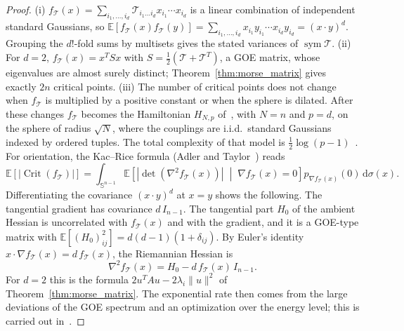 \documentclass[11pt,a4paper,reqno]{amsart}
\theoremstyle{definition}
\numberwithin{equation}{section}
\providecommand{\Sph}{\mathbb{S}}
\newcommand{\dif}{\,\mathrm{d}}
\begin{document}
\begin{proof}
(i) $f_{\mathcal{T}}(x) = \sum_{i_1,\dots,i_d} \mathcal{T}_{i_1\dots i_d} x_{i_1}\cdots x_{i_d}$ is a linear combination of independent standard Gaussians, so $\mathbb{E}[f_{\mathcal{T}}(x) f_{\mathcal{T}}(y)] = \sum_{i_1,\dots,i_d} x_{i_1} y_{i_1} \cdots x_{i_d} y_{i_d} = (x\cdot y)^d$. Grouping the $d!$-fold sums by multisets gives the stated variances of $\operatorname{sym}\mathcal{T}$.
(ii) For $d = 2$, $f_{\mathcal{T}}(x) = x^T S x$ with $S = \frac12(\mathcal{T} + \mathcal{T}^T)$, a GOE matrix, whose eigenvalues are almost surely distinct; Theorem~\ref{thm:morse_matrix} gives exactly $2n$ critical points.
(iii) The number of critical points does not change when $f_{\mathcal{T}}$ is multiplied by a positive constant or when the sphere is dilated. After these changes $f_{\mathcal{T}}$ becomes the Hamiltonian $H_{N,p}$ of~\cite{auffinger2013random}, with $N = n$ and $p = d$, on the sphere of radius $\sqrt{N}$, where the couplings are i.i.d.\ standard Gaussians indexed by ordered tuples. The total complexity of that model is $\frac12\log(p-1)$~\cite{auffinger2013random}. For orientation, the Kac--Rice formula (Adler and Taylor~\cite{adler2007random}) reads
\begin{equation}
    \mathbb{E}[|\operatorname{Crit}(f_{\mathcal{T}})|] = \int_{\Sph^{n-1}} \mathbb{E}\left[ |\det(\nabla^2 f_{\mathcal{T}}(x))| \;\middle|\; \nabla f_{\mathcal{T}}(x) = 0 \right] p_{\nabla f_{\mathcal{T}}(x)}(0) \dif \sigma(x).
\end{equation}
Differentiating the covariance $(x\cdot y)^d$ at $x = y$ shows the following. The tangential gradient has covariance $d\, I_{n-1}$. The tangential part $H_0$ of the ambient Hessian is uncorrelated with $f_{\mathcal{T}}(x)$ and with the gradient, and it is a GOE-type matrix with $\mathbb{E}[(H_0)_{ij}^2] = d(d-1)(1+\delta_{ij})$. By Euler's identity $x \cdot \nabla f_{\mathcal{T}}(x) = d\, f_{\mathcal{T}}(x)$, the Riemannian Hessian is
\begin{equation}
    \nabla^2 f_{\mathcal{T}}(x) = H_0 - d\, f_{\mathcal{T}}(x)\, I_{n-1}.
\end{equation}
For $d = 2$ this is the formula $2u^TAu - 2\lambda_i\|u\|^2$ of Theorem~\ref{thm:morse_matrix}. The exponential rate then comes from the large deviations of the GOE spectrum and an optimization over the energy level; this is carried out in~\cite{auffinger2013random}.

\end{proof}
\end{document}
